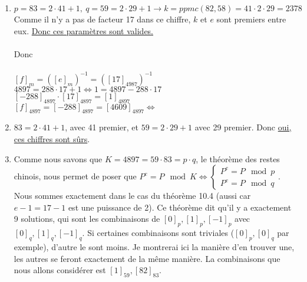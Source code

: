 \documentclass[10p,a4paper]{scrartcl}
\begin{document}
\subsection{}
\begin{enumerate}
	\item 	$p = 83 = 2\cdot41 + 1,\ q =59 = 2\cdot 29 + 1 \to k = ppmc(82,58) = 41\cdot 2\cdot 29 = 2378$ Comme il n'y a pas de facteur 17 dans ce chiffre, $k$ et $e$ sont premiers entre eux. \uline{Donc ces paramètres sont valides.}\\
			\\
			Donc \\
			\\
			$[f]_{m} =([e]_{m})^{-1} = ([17]_{4987})^{-1}$\\
			$4897 = 288\cdot 17 + 1 \iff 1 = 4897 -	288\cdot 17$\\
			$[-288]_{4897}\cdot[17]_{4897} = [1]_{4897}$\\
			$[f]_{4897} = [-288]_{4897} = [4609]_{4897} \iff$ 
			
	\item	$83 = 2 \cdot 41 + 1$, avec 41 premier, et $59 = 2\cdot 29 + 1$ avec 29 premier. Donc \uline{oui, ces chiffres sont sûrs}.
	
	\item	Comme nous savons que $K = 4897 = 59\cdot 83 = p\cdot q$, le théorème des restes chinois, nous permet de poser que $P^e = P \mod K 			\iff 
			\left\{
				\begin{array}{l}
					P^e = P \mod p\\
					P^e = P \mod q
				\end{array}
			\right.$. Nous sommes exactement dans le cas du théorème 10.4 (aussi car $e-1 = 17-1$ est une puissance de 2). Ce théorème dit qu'il y a exactement 9 solutions, qui sont les combinaisons de $[0]_p,[1]_p,[-1]_p$ avec $[0]_q,[1]_q,[-1]_q$. Si certaines combinaisons sont triviales ($[0]_p,[0]_q$ par exemple), d'autre le sont moins. Je montrerai ici la manière d'en trouver une, les autres se feront exactement de la même manière. La combinaisons que nous allons considérer est $[1]_{59},[82]_{83}$.
	

\end{enumerate}
\end{document}
